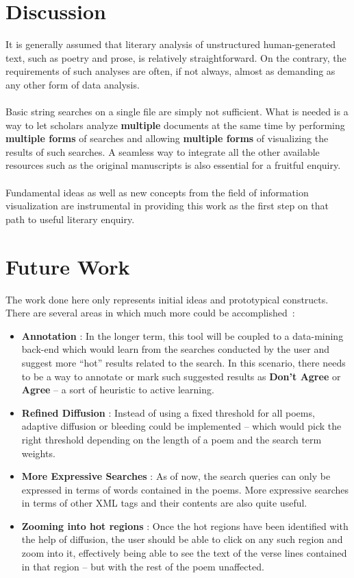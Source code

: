 \documentclass[10pt, twocolumn]{article}
\begin{document}
\section{Discussion}\label{sec:disc}
It is generally assumed that literary analysis of unstructured human-generated text, such as poetry and prose, is relatively straightforward. On the contrary, the requirements of such analyses are often, if not always, almost as demanding as any other form of data analysis. \\ \\
Basic string searches on a single file are simply not sufficient. What is needed is a way to let scholars analyze \textbf{multiple} documents at the same time by performing \textbf{multiple forms} of searches and allowing \textbf{multiple forms} of visualizing the results of such searches. A seamless way to integrate all the other available resources such as the original manuscripts is also essential for a fruitful enquiry. \\ \\
Fundamental ideas as well as new concepts from the field of information visualization are instrumental in providing this work as the first step on that path to useful literary enquiry. 
\section{Future Work}\label{sec:future}
The work done here only represents initial ideas and prototypical constructs. There are several areas in which much more could be accomplished~:
\begin{itemize}
  \item \textbf{Annotation} : In the longer term, this tool will be coupled to a data-mining back-end which would learn from the searches conducted by the user and suggest more ``hot'' results related to the search. In this scenario, there needs to be a way to annotate or mark such suggested results as \textbf{Don't Agree} or \textbf{Agree} -- a sort of heuristic to active learning. 
  \item \textbf{Refined Diffusion} : Instead of using a fixed threshold for all poems, adaptive diffusion or bleeding could be implemented -- which would pick the right threshold depending on the length of a poem and the search term weights. 
  \item \textbf{More Expressive Searches} : As of now, the search queries can only be expressed in terms of words contained in the poems. More expressive searches in terms of other XML tags and their contents are also quite useful. 
  \item \textbf{Zooming into hot regions} : Once the hot regions have been identified with the help of diffusion, the user should be able to click on any such region and zoom into it, effectively being able to see the text of the verse lines contained in that region -- but with the rest of the poem unaffected. 
\end{itemize}
\end{document}
